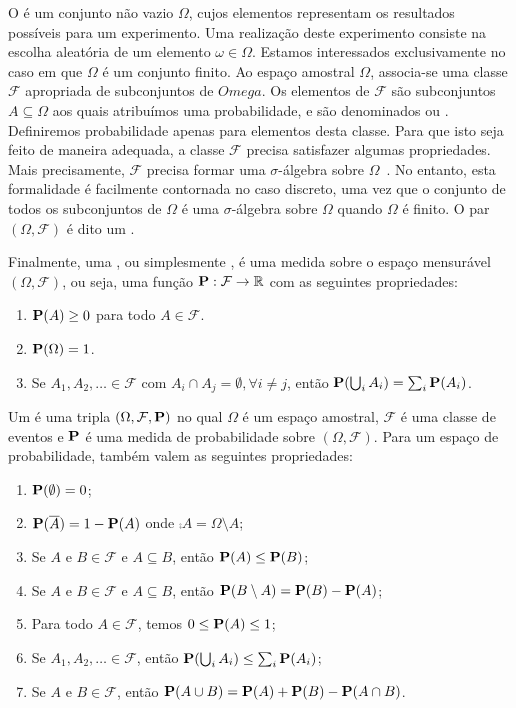 O  é um conjunto não vazio $\Omega$, cujos elementos representam os resultados possíveis para um experimento. Uma realização deste experimento consiste na escolha aleatória de um elemento $\omega \in \Omega$. Estamos interessados exclusivamente no caso em que $\Omega$ é um conjunto finito. Ao espaço amostral $\Omega$, associa-se uma classe $\mathcal{F}$ apropriada de subconjuntos de $Omega$. Os elementos de $\mathcal{F}$ são subconjuntos $A \subseteq \Omega$ aos quais atribuímos uma probabilidade, e são denominados  ou . Definiremos probabilidade apenas para elementos desta classe. Para que isto seja feito de maneira adequada, a classe $\mathcal{F}$ precisa satisfazer algumas propriedades. Mais precisamente, $\mathcal{F}$ precisa formar uma $\sigma$-álgebra sobre $\Omega$~\cite{barryjames}.
No entanto, esta formalidade é facilmente contornada no caso discreto, uma vez que o conjunto de todos os subconjuntos de $\Omega$ é uma $\sigma$-álgebra sobre $\Omega$ quando $\Omega$ é finito. O par $(\Omega, \mathcal{F})$ é dito um .

Finalmente, uma , ou simplesmente , é uma medida sobre o espaço mensurável $(\Omega, \mathcal{F})$, ou seja, uma função $\operatorname{\mathbf{P}} : \mathcal{F} \to \mathbb{R}$ com as seguintes propriedades:

\begin{enumerate}[label=(P\arabic*),itemindent=*]
  \item $\operatorname{\mathbf{P}}(A) \geq 0$ para todo $A \in \mathcal{F}$.
  \item $\operatorname{\mathbf{P}}(\Omega) = 1$.
  \item Se $A_1, A_2, \dots \in \mathcal{F}$ com $A_i \cap A_j = \emptyset, \forall i \neq j$, então $\operatorname{\mathbf{P}}( \bigcup_{i} A_i ) = \sum_i \operatorname{\mathbf{P}}(A_i)$.
\end{enumerate}

Um  é uma tripla $(\Omega, \mathcal{F}, \operatorname{\mathbf{P}})$ no qual $\Omega$ é um espaço amostral, $\mathcal{F}$ é uma classe de eventos e $\operatorname{\mathbf{P}}$ é uma medida de probabilidade sobre $(\Omega, \mathcal{F})$. Para um espaço de probabilidade, também valem as seguintes propriedades:

\begin{enumerate}[label=\arabic*.,itemindent=*]
  \item $\operatorname{\mathbf{P}}(\emptyset) = 0$;
  \item $\operatorname{\mathbf{P}}(\overline{A}) = 1 - \operatorname{\mathbf{P}}(A)$ onde $\comp{A} = \Omega \setminus A$;
  \item Se $A$ e $B \in \mathcal{F}$ e $A \subseteq B$, então $\operatorname{\mathbf{P}}(A) \leq \operatorname{\mathbf{P}}(B)$;
  \item Se $A$ e $B \in \mathcal{F}$ e $A \subseteq B$, então $\operatorname{\mathbf{P}}(B \setminus A) = \operatorname{\mathbf{P}}(B) - \operatorname{\mathbf{P}}(A)$;
  \item Para todo $A \in \mathcal{F}$, temos $0 \leq \operatorname{\mathbf{P}}(A) \leq 1$;
  \item Se $A_1, A_2, \dots \in \mathcal{F}$, então $\operatorname{\mathbf{P}}( \bigcup_{i} A_i ) \leq \sum_i \operatorname{\mathbf{P}}(A_i)$;
  \item Se $A$ e $B \in \mathcal{F}$, então $\operatorname{\mathbf{P}}(A \cup B) = \operatorname{\mathbf{P}}(A) + \operatorname{\mathbf{P}}(B) - \operatorname{\mathbf{P}}(A \cap B)$.
\end{enumerate}

